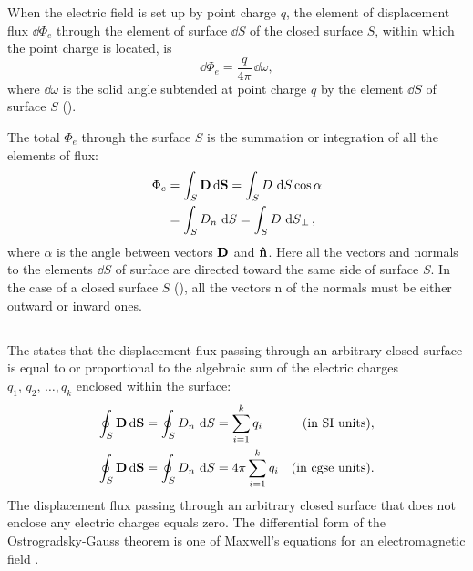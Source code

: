 When the electric field is set up by point charge $q$, the element of displacement flux $\dd \Phi_{e}$ through the element of surface $\dd S$ of the closed surface $S$, within which the point charge is located, is
\begin{equation*}%
\dd \Phi_{e} = \frac{q}{4 \pi} \, \dd \omega,
\end{equation*}
where $\dd \omega$ is the solid angle subtended at point charge $q$ by the element $\dd S$ of surface $S$ ().

The total  $\Phi_{e}$ through the surface $S$ is the summation or integration of all the elements of flux:
\begin{align*}%
\Phi_{e} & = \int_{S} \vb{D} \, \dd \vb{S} = \int_{S} {D} \, \dd {S} \cos \alpha \\
& = \int_{S} {D}_{n} \, \dd {S} = \int_{S} {D} \, \dd {S}_{\perp},
\end{align*}
where $\alpha $ is the angle between vectors $\vb{D}$ and $\vu{n}$. Here all the vec­tors and normals to the elements $\dd S$ of surface are directed toward the same side of surface $S$. In the case of a closed surface $S$ (), all the vectors n of the normals must be either outward or inward ones.

\subsection{}\label{15.3.3} The  states that the displacement flux passing through an arbitrary closed surface is equal to or proportional to the algebraic sum of the electric charges $q_{1},\,q_{2},\, \ldots{}, q_{k}$ enclosed within the surface:
\begin{align*}%
\oint_{S} \vb{D} \, \dd \vb{S} & = \oint_{S} {D}_{n} \, \dd {S}  = \sum_{i=1}^{k} q_{i} & \text{(in SI units)},\\
\oint_{S} \vb{D} \, \dd \vb{S} & = \oint_{S} {D}_{n} \, \dd {S}  = 4 \pi \sum_{i=1}^{k} q_{i} & \text{(in cgse units).}
\end{align*}
The displacement flux passing through an arbitrary closed sur­face that does not enclose any electric charges equals zero. The differential form of the Ostrogradsky-Gauss theorem is one of Maxwell's equations for an electromagnetic field .

